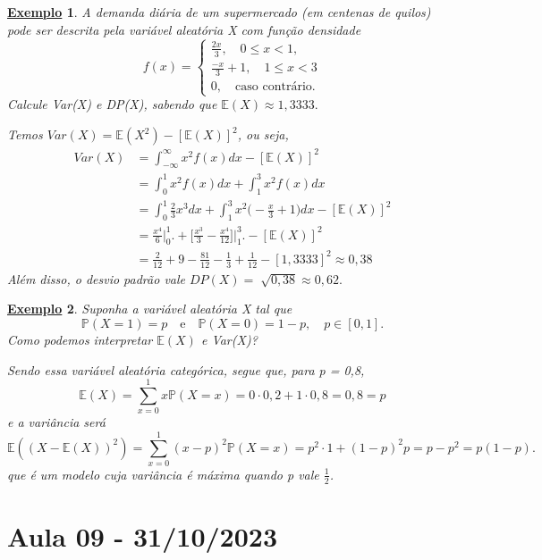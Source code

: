 \documentclass{article}
\newtheorem{example}{\underline{Exemplo}}
\begin{document}
\begin{example}
  A demanda diária de um supermercado (em centenas de quilos) pode ser descrita pela variável aleatória X com função densidade 
  \[
    f(x) = \left\{\begin{array}{ll}
        \frac{2x}{3},\quad 0\leq x <1,\\
        \frac{-x}{3} + 1,\quad 1\leq x <3\\
        0,\quad \text{caso contrário}.
    \end{array}\right.
  \]
  Calcule Var(X) e DP(X), sabendo que \(\mathbb{E}(X)\approx 1,3333.\)

  Temos \(Var(X) = \mathbb{E}(X^{2}) - [\mathbb{E}(X)]^{2}\), ou seja, 
  \begin{align*}
    Var(X) &= \int_{-\infty}^{\infty}x^{2}f(x)dx - [\mathbb{E}(X)]^{2}\\
           &= \int_{0}^{1}x^{2}f(x)dx + \int_{1}^{3}x^{2}f(x)dx\\
           &= \int_{0}^{1}\frac{2}{3}x^{3}dx + \int_{1}^{3}x^{2}\biggl(-\frac{x}{3}+1\biggr)dx - [\mathbb{E}(X)]^{2}\\
           &= \frac{x^{4}}{6}\biggl|_{0}^{1}\biggr. + \biggl[\frac{x^{3}}{3}-\frac{x^{4}}{12}\biggr]\biggl|_{1}^{3}\biggr. - [\mathbb{E}(X)]^{2}\\
           &= \frac{2}{12} + 9 - \frac{81}{12} - \frac{1}{3} + \frac{1}{12} - [1,3333]^{2}\approx 0,38
  \end{align*}
  Além disso, o desvio padrão vale \(DP(X) = \sqrt[]{0,38}\approx 0,62.\)
\end{example}
\begin{example}
  Suponha a variável aleatória X tal que 
  \[
    \mathbb{P}(X=1) = p\quad\text{e}\quad \mathbb{P}(X=0) = 1-p,\quad p\in [0, 1].
  \]
  Como podemos interpretar \(\mathbb{E}(X)\) e Var(X)?

  Sendo essa variável aleatória categórica, segue que, para p = 0,8,
  \[
    \mathbb{E}(X) = \sum\limits_{x=0}^{1}x \mathbb{P}(X=x) = 0 \cdot 0,2 + 1 \cdot 0,8 = 0,8 = p
  \]
  e a variância será 
  \[
    \mathbb{E}((X-\mathbb{E}(X))^{2}) = \sum\limits_{x=0}^{1}(x-p)^{2}\mathbb{P}(X=x) = p^{2}\cdot 1 + (1-p)^{2}p = p - p^{2} = p(1-p).
  \]
  que é um modelo cuja variância é máxima quando p vale \(\frac{1}{2}\).
\end{example}
\newpage

\section{Aula 09 - 31/10/2023}
\end{document}
